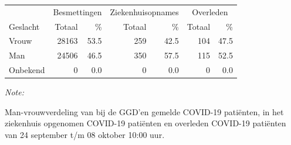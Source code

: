 \documentclass[
  english,
  man,floatsintext]{apa6}
\begin{document}
\begin{table}[H]
\centering\begingroup\fontsize{11}{13}\selectfont

\begin{threeparttable}
\begin{tabular}{lrrrrrr}
\toprule
\multicolumn{1}{c}{ } & \multicolumn{2}{c}{Besmettingen} & \multicolumn{2}{c}{Ziekenhuisopnames} & \multicolumn{2}{c}{Overleden} \\
\cmidrule(l{3pt}r{3pt}){2-3} \cmidrule(l{3pt}r{3pt}){4-5} \cmidrule(l{3pt}r{3pt}){6-7}
Geslacht & Totaal & \% & Totaal & \% & Totaal & \%\\
\midrule
Vrouw & 28163 & 53.5 & 259 & 42.5 & 104 & 47.5\\
Man & 24506 & 46.5 & 350 & 57.5 & 115 & 52.5\\
Onbekend & 0 & 0.0 & 0 & 0.0 & 0 & 0.0\\
\bottomrule
\end{tabular}
\begin{tablenotes}
\item \textit{Note: } 
\item Man-vrouwverdeling van bij de GGD’en gemelde COVID-19 patiënten, in het ziekenhuis opgenomen COVID-19 patiënten en overleden COVID-19 patiënten van 24 september t/m 08 oktober 10:00 uur.
\end{tablenotes}
\end{threeparttable}
\endgroup{}
\end{table}
\newpage
\end{document}
